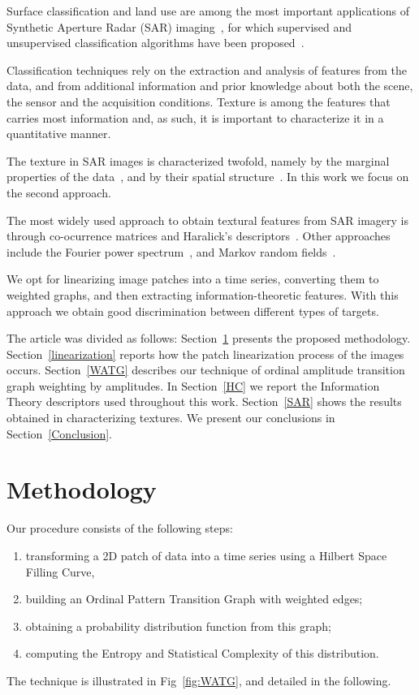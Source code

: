\documentclass{isprs}
\begin{document}
	Surface classification and land use are among the most important applications of Synthetic Aperture Radar (SAR) imaging~\citep{Pottier2004Unsupervised}, for which supervised and unsupervised classification algorithms have been proposed~\citep{Bhattacharya2018Unsupervised,Chen1996multifrequency,ZYL1992Bayesian}.
	
	Classification techniques rely on the extraction and analysis of features from the data, and from additional information and prior knowledge about both the scene, the sensor and the acquisition conditions.
	Texture is among the features that carries most information and, as such, it is important to characterize it in a quantitative manner.
	
	The texture in SAR images is characterized twofold, namely by the marginal properties of the data~\citep{adrian96}, and by their spatial structure~\citep{FeaturesCropDiscrimination}.
	In this work we focus on the second approach.
	
	The most widely used approach to obtain textural features from SAR imagery is through co-ocurrence matrices and Haralick's descriptors~\citep{Zakeri2017Texture}.
	Other approaches include the Fourier power spectrum~\citep{Florindo2012Fractal}, and
	Markov random fields~\citep{Deng2005UnsupervisedSO}.
	
	We opt for linearizing image patches into a time series, converting them to weighted graphs, and then extracting information-theoretic features.
	With this approach we obtain good discrimination between different types of targets.
	
	The article was divided as follows:
	Section~\ref{methodology} presents the proposed methodology.
	Section~\ref{linearization} reports how the patch linearization process of the images occurs.
	Section~\ref{WATG} describes our technique of ordinal amplitude transition graph weighting by amplitudes.
	In Section~\ref{HC} we report the Information Theory descriptors used throughout this work.
	Section~\ref{SAR} shows the results obtained in characterizing textures.
	We present our conclusions in Section~\ref{Conclusion}.
	
	\section{Methodology}\label{methodology}
	
	Our procedure consists of the following steps:
	\begin{enumerate}
		\item\label{item:Linearlize} transforming a 2D patch of data into a time series using a Hilbert Space Filling Curve,
		\item\label{item:WOPTG} building an Ordinal Pattern Transition Graph with weighted edges;
		\item\label{item:Probability} obtaining a probability distribution function from this graph;
		\item\label{item:Descriptors} computing the Entropy and Statistical Complexity of this distribution.
	\end{enumerate}
	The technique is illustrated in Fig~\ref{fig:WATG}, and detailed in the following.
	
\end{document}
